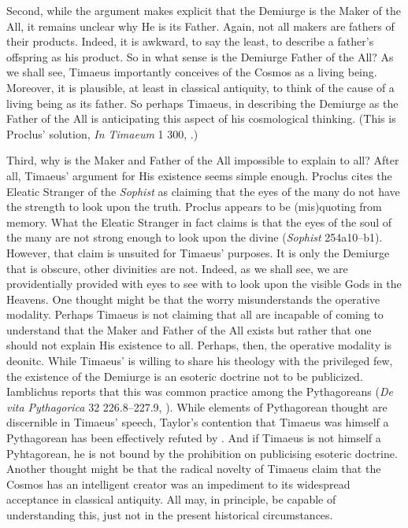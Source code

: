 Second, while the argument makes explicit that the Demiurge is the Maker of the All, it remains unclear why He is its Father. Again, not all makers are fathers of their products. Indeed, it is awkward, to say the least, to describe a father's offspring as his product. So in what sense is the Demiurge Father of the All? As we shall see, Timaeus importantly conceives of the Cosmos as a living being. Moreover, it is plausible, at least in classical antiquity, to think of the cause of a living being as its father. So perhaps Timaeus, in describing the Demiurge as the Father of the All is anticipating this aspect of his cosmological thinking. (This is Proclus' solution, \emph{In Timaeum} 1 300, \citealt{Diehl:1903re}.)

Third, why is the Maker and Father of the All impossible to explain to all? After all, Timaeus' argument for His existence seems simple enough. Proclus cites the Eleatic Stranger of the \emph{Sophist} as claiming that the eyes of the many do not have the strength to look upon the truth. Proclus appears to be (mis)quoting from memory. What the Eleatic Stranger in fact claims is that the eyes of the soul of the many are not strong enough to look upon the divine (\emph{Sophist} 254a10--b1). However, that claim is unsuited for Timaeus' purposes. It is only the Demiurge that is obscure, other divinities are not. Indeed, as we shall see, we are providentially provided with eyes to see with to look upon the visible Gods in the Heavens. One thought might be that the worry misunderstands the operative modality. Perhaps Timaeus is not claiming that all are incapable of coming to understand that the Maker and Father of the All exists but rather that one should not explain His existence to all. Perhaps, then, the operative modality is deonitc. While Timaeus' is willing to share his theology with the privileged few, the existence of the Demiurge is an esoteric doctrine not to be publicized. Iamblichus reports that this was common practice among the Pythagoreans (\emph{De vita Pythagorica} 32 226.8--227.9, \citealt{Deubner:1937ys}). While elements of Pythagorean thought are discernible in Timaeus' speech, Taylor's \citeyearpar{Taylor:1928qb} contention that Timaeus was himself a Pythagorean has been effectively refuted by \citet{Cornford:1935fk}. And if Timaeus is not himself a Pyhtagorean, he is not bound by the prohibition on publicising esoteric doctrine. Another thought might be that the radical novelty of Timaeus claim that the Cosmos has an intelligent creator was an impediment to its widespread acceptance in classical antiquity. All may, in principle, be capable of understanding this, just not in the present historical circumstances.


